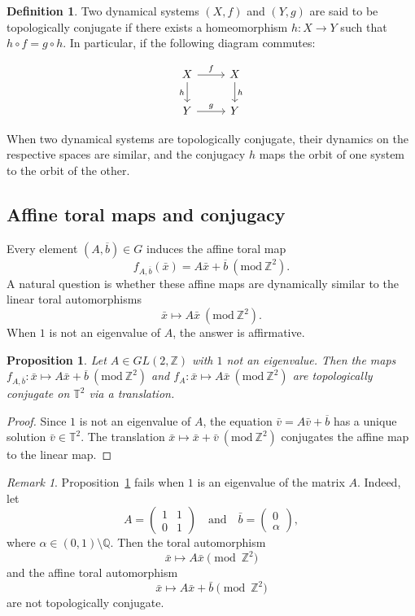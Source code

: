 \documentclass[12pt]{amsart}
\theoremstyle{plain}
\newtheorem{proposition}[theorem]{Proposition}
\theoremstyle{definition}
\newtheorem{definition}[theorem]{Definition}
\theoremstyle{remark}
\newtheorem{remark}{Remark}
\begin{document}
\begin{definition}\label{topological conjugacy}
    Two dynamical systems $(X,f)$ and $(Y,g)$ are said to be topologically conjugate if there exists a homeomorphism $h:X\to Y$ such that $h\circ f=g\circ h$. In particular, if the following diagram commutes:
\end{definition}

\[ \begin{tikzcd}
X\arrow{r}{f} \arrow[swap]{d}{h} & X \arrow{d}{h} \\%
Y \arrow{r}{g}& Y
\end{tikzcd}
\]

When two dynamical systems are topologically conjugate, their dynamics on the respective spaces are similar, and the conjugacy $h$ maps the orbit of one system to the orbit of the other.


\subsection*{Affine toral maps and conjugacy}

Every element $(A,\overline{b}) \in G$ induces the affine toral map
$$
f_{A,\overline{b}}(\bar{x}) = A\bar{x} + \overline{b} ~(\text{mod}~\mathbb{Z}^2).
$$
A natural question is whether these affine maps are dynamically similar to the linear toral automorphisms
$$
\bar{x} \mapsto A\bar{x}~(\text{mod}~\mathbb{Z}^2).
$$
When $1$ is not an eigenvalue of $A$, the answer is affirmative.


\begin{proposition}\label{conjugacy}
Let $A \in GL(2,\mathbb{Z})$ with $1$ not an eigenvalue.  
Then the maps $f_{A,\overline{b}}: \bar{x} \mapsto A\bar{x} + \overline{b}~(\text{mod}~\mathbb{Z}^2)$ and $f_A:\bar{x} \mapsto A\bar{x}~(\text{mod}~\mathbb{Z}^2)$ are topologically conjugate on $\mathbb{T}^2$ via a translation.
\end{proposition}

\begin{proof}
Since $1$ is not an eigenvalue of $A$, the equation $\bar{v} = A\bar{v} + \overline{b}$ has a unique solution $\bar{v} \in \mathbb{T}^2$.  
The translation $\bar{x} \mapsto \bar{x}+\bar{v}~(\text{mod}~\mathbb{Z}^2)$ conjugates the affine map to the linear map.
\end{proof}

\begin{remark}
Proposition~\ref{conjugacy} fails when $1$ is an eigenvalue of the matrix $A$.
Indeed, let
\[
A=\begin{pmatrix}
1 & 1\\
0 & 1
\end{pmatrix}
\quad \text{and} \quad
\bar{b}=
\begin{pmatrix}
0\\
\alpha
\end{pmatrix},
\]
where $\alpha\in(0,1)\setminus\mathbb{Q}$.
Then the toral automorphism
\[
\bar{x} \longmapsto A\bar{x} \pmod{\mathbb Z^{2}}
\]
and the affine toral automorphism
\[
\bar{x} \longmapsto A\bar{x}+\bar b \pmod{\mathbb Z^{2}}
\]
are not topologically conjugate.
\end{remark}
\end{document}
